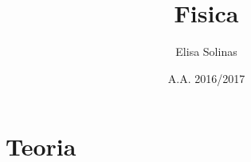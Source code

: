\documentclass[12pt, oneside]{book}
\title{Fisica}
\author{Elisa Solinas}
\date{A.A. 2016/2017}
\begin{document}
\maketitle
\tableofcontents
\part{Teoria}




\end{document}
